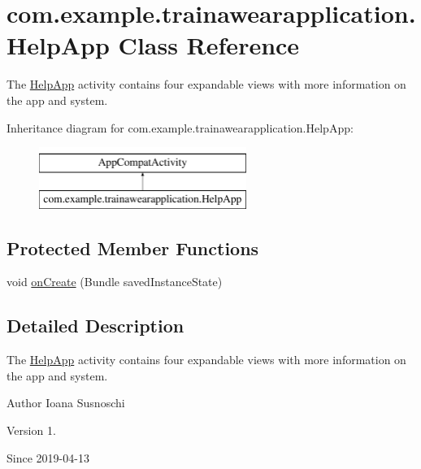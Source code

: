 \hypertarget{classcom_1_1example_1_1trainawearapplication_1_1_help_app}{}\section{com.\+example.\+trainawearapplication.\+Help\+App Class Reference}
\label{classcom_1_1example_1_1trainawearapplication_1_1_help_app}


The \mbox{\hyperlink{classcom_1_1example_1_1trainawearapplication_1_1_help_app}{Help\+App}} activity contains four expandable views with more information on the app and system.  


Inheritance diagram for com.\+example.\+trainawearapplication.\+Help\+App\+:\begin{figure}[H]
\begin{center}
\leavevmode
\includegraphics[height=2.000000cm]{classcom_1_1example_1_1trainawearapplication_1_1_help_app}
\end{center}
\end{figure}
\subsection*{Protected Member Functions}
\begin{DoxyCompactItemize}
\item 
void \mbox{\hyperlink{classcom_1_1example_1_1trainawearapplication_1_1_help_app_a8fb144074fe5f839efbbdbfb16edd528}{on\+Create}} (Bundle saved\+Instance\+State)
\end{DoxyCompactItemize}


\subsection{Detailed Description}
The \mbox{\hyperlink{classcom_1_1example_1_1trainawearapplication_1_1_help_app}{Help\+App}} activity contains four expandable views with more information on the app and system. 

\begin{DoxyAuthor}{Author}
Ioana Susnoschi 
\end{DoxyAuthor}
\begin{DoxyVersion}{Version}
1. 
\end{DoxyVersion}
\begin{DoxySince}{Since}
2019-\/04-\/13 
\end{DoxySince}


